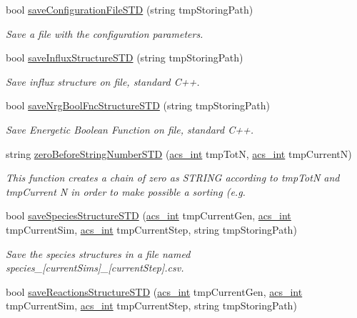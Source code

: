 \begin{DoxyCompactItemize}
bool \hyperlink{a00011_a71f4c5ff1c11a9d61cbc818682a4a91e}{save\-Configuration\-File\-S\-T\-D} (string tmp\-Storing\-Path)
\begin{DoxyCompactList}\small\item\em Save a file with the configuration parameters. \end{DoxyCompactList}\item 
bool \hyperlink{a00011_a8f831e2db11fa5d840484345dac64fc7}{save\-Influx\-Structure\-S\-T\-D} (string tmp\-Storing\-Path)
\begin{DoxyCompactList}\small\item\em Save influx structure on file, standard C++. \end{DoxyCompactList}\item 
bool \hyperlink{a00011_a1412b9b1c3bd3e42bcb481f5e18ea931}{save\-Nrg\-Bool\-Fnc\-Structure\-S\-T\-D} (string tmp\-Storing\-Path)
\begin{DoxyCompactList}\small\item\em Save Energetic Boolean Function on file, standard C++. \end{DoxyCompactList}\item 
string \hyperlink{a00011_a8699a0f85f5e8dc23eb8f78fa22c6b17}{zero\-Before\-String\-Number\-S\-T\-D} (\hyperlink{a00024_a8d277355641a098190360234e2ebde35}{acs\-\_\-int} tmp\-Tot\-N, \hyperlink{a00024_a8d277355641a098190360234e2ebde35}{acs\-\_\-int} tmp\-Current\-N)
\begin{DoxyCompactList}\small\item\em This function creates a chain of zero as S\-T\-R\-I\-N\-G according to tmp\-Tot\-N and tmp\-Current N in order to make possible a sorting (e.\-g. \end{DoxyCompactList}\item 
bool \hyperlink{a00011_a9daeb4f255100b8ad59de9ea80b19b5b}{save\-Species\-Structure\-S\-T\-D} (\hyperlink{a00024_a8d277355641a098190360234e2ebde35}{acs\-\_\-int} tmp\-Current\-Gen, \hyperlink{a00024_a8d277355641a098190360234e2ebde35}{acs\-\_\-int} tmp\-Current\-Sim, \hyperlink{a00024_a8d277355641a098190360234e2ebde35}{acs\-\_\-int} tmp\-Current\-Step, string tmp\-Storing\-Path)
\begin{DoxyCompactList}\small\item\em Save the species structures in a file named species\-\_\-\mbox{[}current\-Sims\mbox{]}\-\_\-\mbox{[}current\-Step\mbox{]}.csv. \end{DoxyCompactList}\item 
bool \hyperlink{a00011_ad381c4ce24045d504539bb7c74800739}{save\-Reactions\-Structure\-S\-T\-D} (\hyperlink{a00024_a8d277355641a098190360234e2ebde35}{acs\-\_\-int} tmp\-Current\-Gen, \hyperlink{a00024_a8d277355641a098190360234e2ebde35}{acs\-\_\-int} tmp\-Current\-Sim, \hyperlink{a00024_a8d277355641a098190360234e2ebde35}{acs\-\_\-int} tmp\-Current\-Step, string tmp\-Storing\-Path)

\end{DoxyCompactItemize}
